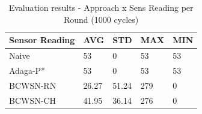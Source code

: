 \documentclass[conference]{IEEEtran}
\begin{document}
\begin{table}[h!]
\caption{Evaluation results - Approach x Sens Reading per Round (1000 cycles)}
\label{tab:sens-read}
\begin{center}
\begin{tabular}{|l||l|l|l|l|}
\hline
Sensor Reading &AVG &STD &MAX &MIN \\
\hline\hline
Naive &53 &0 &53 &53 \\
\hline
Adaga-P* &53 &0 &53 &53 \\
\hline
BCWSN-RN &26.27 &51.24 &279 &0 \\
\hline
BCWSN-CH &41.95 &36.14 &276 &0 \\
\hline
\end{tabular}
\end{center}
\end{table}
\end{document}
